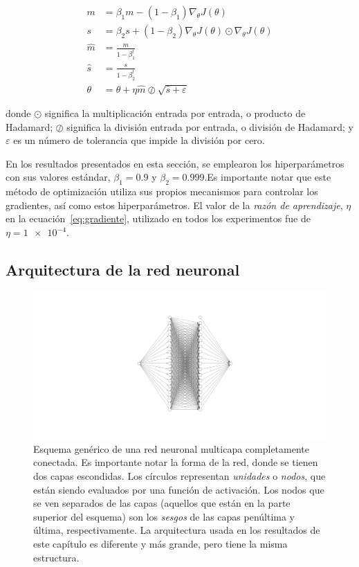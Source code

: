 \begin{align}
    m &= \beta_1 m - (1 - \beta_1) \nabla_{\theta} J(\theta) \nonumber \\
    s &= \beta_2 s + (1 - \beta_2) \nabla_{\theta} J(\theta) \odot \nabla_{\theta} J(\theta) \nonumber \\
    \hat{m} &= \frac{m}{1 - \beta_1^t} \nonumber \\
    \hat{s} &= \frac{s}{1 - \beta_2^t} \nonumber \\
    \theta &= \theta + \eta \hat{m} \oslash \sqrt{\hat{s} + \varepsilon}
    \label{eq:adam}
\end{align}

donde $\odot$ significa la multiplicación entrada por entrada, o producto de Hadamard;
$\oslash$ significa la división entrada por entrada, o división de Hadamard;
y $\varepsilon$ es un número de tolerancia que impide la división por cero.

En los resultados presentados en esta sección, se emplearon los hiperparámetros con sus
valores estándar, $\beta_1=\num{0.9}$ y $\beta_2=\num{0.999}$.Es importante notar que
este método de optimización utiliza sus propios mecanismos para controlar los gradientes,
así como estos hiperparámetros. El valor de la \emph{razón de aprendizaje}, $\eta$
en la ecuación~\eqref{eq:gradiente}, utilizado en todos los experimentos fue de
$\eta=\num{1e-4}$.

\subsection{Arquitectura de la red neuronal}

\begin{figure}[t]
    \includegraphics[width=\textwidth]{figuras/capitulo-3/neural-network.pdf}
    \vspace{-1.5cm}
    \caption{Esquema genérico de una red neuronal multicapa completamente conectada. Es importante notar la forma de la red, donde se tienen dos capas escondidas. Los círculos representan \emph{unidades} o \emph{nodos}, que están siendo evaluados por una función de activación. Los nodos que se ven separados de las capas (aquellos que están en la parte superior del esquema) son los \emph{sesgos} de las capas penúltima y última, respectivamente. La arquitectura usada en los resultados de este capítulo es diferente y más grande, pero tiene la misma estructura.}
    \label{fig:nn-esquema}
\end{figure}

